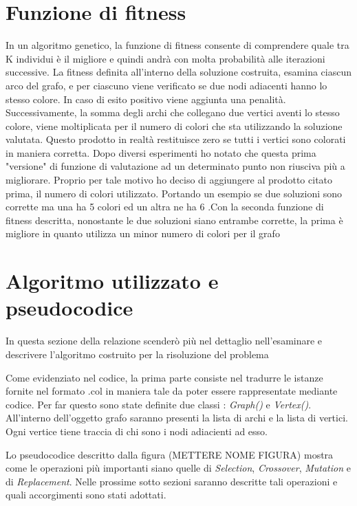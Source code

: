 \documentclass{article}
\begin{document}
\begin{enumerate}

\section{Funzione di fitness}
In un algoritmo genetico, la funzione di fitness consente di comprendere quale tra K individui è il migliore e quindi andrà con molta probabilità alle iterazioni successive. La fitness definita all'interno della soluzione costruita, esamina ciascun arco del grafo, e per ciascuno viene verificato se due nodi adiacenti hanno lo stesso colore. In caso di esito positivo viene aggiunta una penalità. Successivamente, la somma degli archi che collegano due vertici aventi lo stesso colore, viene moltiplicata per il numero di colori che sta utilizzando la soluzione valutata. Questo prodotto in realtà restituisce zero se tutti i vertici sono colorati in maniera corretta. Dopo diversi esperimenti ho notato che questa prima "versione" di funzione di valutazione ad un determinato punto non riusciva più a migliorare. Proprio per tale motivo ho deciso di aggiungere al prodotto citato prima, il numero di colori utilizzato. Portando un esempio se due soluzioni sono corrette ma una ha 5 colori ed un altra ne ha 6 .Con la seconda funzione di fitness descritta, nonostante le due soluzioni siano entrambe corrette, la prima è migliore in quanto utilizza un minor numero di colori per il grafo


\section{Algoritmo utilizzato e pseudocodice}
In questa sezione della relazione scenderò più nel dettaglio nell'esaminare e descrivere l'algoritmo costruito per la risoluzione del problema 


\noindent Come evidenziato nel codice, la prima parte consiste nel tradurre le istanze fornite nel formato .col in maniera tale da poter essere rappresentate mediante codice. Per far questo sono state definite due classi : \textit{Graph()} e \textit{Vertex()}. All'interno dell'oggetto grafo saranno presenti la lista di archi e la lista di vertici. Ogni vertice tiene traccia di chi sono i nodi adiacienti ad esso.


\noindent Lo pseudocodice descritto dalla figura (METTERE NOME FIGURA) mostra come le operazioni più importanti siano quelle di \textit{Selection}, \textit{Crossover}, \textit{Mutation} e di \textit{Replacement}. Nelle prossime sotto sezioni saranno descritte tali operazioni e quali accorgimenti sono stati adottati.


\end{enumerate}
\end{document}
